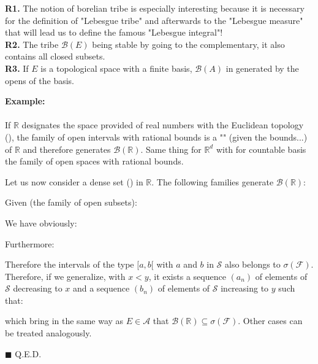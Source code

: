 	\begin{tcolorbox}[title=Remarks,arc=10pt,breakable,drop lifted shadow,
  skin=enhanced,
  skin first is subskin of={enhancedfirst}{arc=10pt,no shadow},
  skin middle is subskin of={enhancedmiddle}{arc=10pt,no shadow},
  skin last is subskin of={enhancedlast}{drop lifted shadow}]
	\textbf{R1.} The notion of borelian tribe is especially interesting because it is necessary for the definition of "Lebesgue tribe" and afterwards to the "Lebesgue measure" that will lead us to define the  famous "Lebesgue integral"!\\
	
	\textbf{R2.} The tribe $\mathcal{B}(E)$ being stable by going to the complementary, it also contains all closed subsets.\\
	
	\textbf{R3.} If $E$ is a topological space with a finite basis, $\mathcal{B}(A)$ in generated by the opens of the basis.
	\end{tcolorbox}	
	\begin{tcolorbox}[colframe=black,colback=white,sharp corners]
	\textbf{{\Large {}}Example:}\\\\
	If $\mathbb{R}$ designates the space provided of real numbers with the Euclidean topology (), the family of open intervals with rational bounds is a "" (given the bounds...) of $\mathbb{R}$ and therefore generates $\mathcal{B}(\mathbb{R})$. Same thing for $\mathbb{R}^d$ with for countable basis the family of open spaces with rational bounds.
	\end{tcolorbox}
	\begin{theorem}
	Let us now consider a dense set () in $\mathbb{R}$. The following families generate $\mathcal{B}(\mathbb{R})$:
	
	\end{theorem}
	\begin{dem}
	Given (the family of open subsets):
	
	We have obviously:
	
	Furthermore:
	
	Therefore the intervals of the type $[a,b[$ with $a$ and $b$ in $\mathcal{S}$ also belongs to $\sigma(\mathcal{F})$. Therefore, if we generalize, with $x<y$, it exists a sequence $(a_n)$ of elements of $\mathcal{S}$ decreasing to $x$ and a sequence $(b_n)$ of elements of $\mathcal{S}$ increasing to $y$ such that:
	
	which bring in the same way as $E\in \mathcal{A}$ that $\mathcal{B}(\mathbb{R})\subseteq\sigma(\mathcal{F})$. Other cases can be treated analogously.
	\begin{flushright}
		$\blacksquare$  Q.E.D.
	\end{flushright}
	\end{dem}
